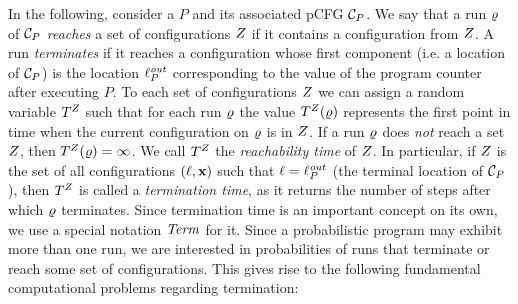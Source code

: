 \smallskip{}
In the following, consider a \PP{} $P$ and its associated pCFG $\mathcal{C}_P$. 
We say that a run $\varrho$ of $\mathcal{C}_P$ \emph{reaches} a set of configurations 
$Z$ if it  contains a configuration from $Z$. A run 
\emph{terminates} if it reaches a 
configuration whose first component (i.e. a location of $\mathcal{C}_P$) is the 
location
$\ell_{P}^{\mathit{out}}$ corresponding to the value of the program counter after 
executing $P$. 
To each set of configurations $Z$ we can assign a random variable 
$T^{Z}$ 
such that for each run $\varrho$ the value $T^{Z}(\varrho)$ represents 
the first 
point in time when 
the current configuration on $\varrho$ is in $Z$. If a run $\varrho$ does 
\emph{not} 
reach a set $Z$, then 
$T^{Z}(\varrho)=\infty$. We call $T^{Z}$ the 
\emph{reachability time} of $Z$. In particular, if $Z$ is the set 
of all configurations $(\ell,\mathbf{x})$ such that $\ell=\ell^{\mathit{out}}_P$ (the 
terminal location of $\mathcal{C}_P$), then $T^{Z}$ is 
called a \emph{termination time}, as it returns the number of steps after which 
$\varrho$ terminates. Since termination time is an important concept on its own, 
we use a special notation $\mathit{Term}$ for it.
Since a probabilistic program may exhibit more than one run, we are interested 
in probabilities of runs that terminate or reach some set of configurations. 
This gives rise to the following fundamental computational problems regarding 
termination:

